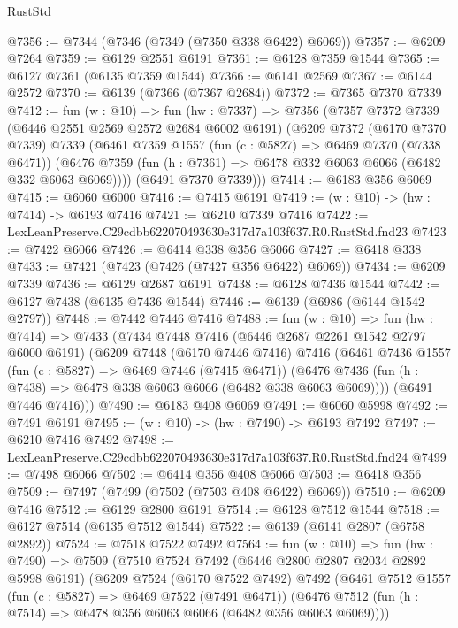 \begin{lexlean}{RustStd}
\begin{coremodule}
@7356 := @7344 (@7346 (@7349 (@7350 @338 @6422) @6069))
@7357 := @6209 @7264
@7359 := @6129 @2551 @6191
@7361 := @6128 @7359 @1544
@7365 := @6127 @7361 (@6135 @7359 @1544)
@7366 := @6141 @2569
@7367 := @6144 @2572
@7370 := @6139 (@7366 (@7367 @2684))
@7372 := @7365 @7370 @7339
@7412 := fun (w : @10) =>
  fun (hw : @7337) =>
  @7356
    (@7357
      @7372
      @7339
      (@6446 @2551 @2569 @2572 @2684 @6002 @6191)
      (@6209
        @7372
        (@6170 @7370 @7339)
        @7339
        (@6461
          @7359
          @1557
          (fun (c : @5827) => @6469 @7370 (@7338 @6471))
          (@6476 @7359 (fun (h : @7361) => @6478 @332 @6063 @6066 (@6482 @332 @6063 @6069))))
        (@6491 @7370 @7339)))
@7414 := @6183 @356 @6069
@7415 := @6060 @6000
@7416 := @7415 @6191
@7419 := (w : @10) -> (hw : @7414) -> @6193 @7416
@7421 := @6210 @7339 @7416
@7422 := LexLeanPreserve.C29cdbb622070493630e317d7a103f637.R0.RustStd.fnd23
@7423 := @7422 @6066
@7426 := @6414 @338 @356 @6066
@7427 := @6418 @338
@7433 := @7421 (@7423 (@7426 (@7427 @356 @6422) @6069))
@7434 := @6209 @7339
@7436 := @6129 @2687 @6191
@7438 := @6128 @7436 @1544
@7442 := @6127 @7438 (@6135 @7436 @1544)
@7446 := @6139 (@6986 (@6144 @1542 @2797))
@7448 := @7442 @7446 @7416
@7488 := fun (w : @10) =>
  fun (hw : @7414) =>
  @7433
    (@7434
      @7448
      @7416
      (@6446 @2687 @2261 @1542 @2797 @6000 @6191)
      (@6209
        @7448
        (@6170 @7446 @7416)
        @7416
        (@6461
          @7436
          @1557
          (fun (c : @5827) => @6469 @7446 (@7415 @6471))
          (@6476 @7436 (fun (h : @7438) => @6478 @338 @6063 @6066 (@6482 @338 @6063 @6069))))
        (@6491 @7446 @7416)))
@7490 := @6183 @408 @6069
@7491 := @6060 @5998
@7492 := @7491 @6191
@7495 := (w : @10) -> (hw : @7490) -> @6193 @7492
@7497 := @6210 @7416 @7492
@7498 := LexLeanPreserve.C29cdbb622070493630e317d7a103f637.R0.RustStd.fnd24
@7499 := @7498 @6066
@7502 := @6414 @356 @408 @6066
@7503 := @6418 @356
@7509 := @7497 (@7499 (@7502 (@7503 @408 @6422) @6069))
@7510 := @6209 @7416
@7512 := @6129 @2800 @6191
@7514 := @6128 @7512 @1544
@7518 := @6127 @7514 (@6135 @7512 @1544)
@7522 := @6139 (@6141 @2807 (@6758 @2892))
@7524 := @7518 @7522 @7492
@7564 := fun (w : @10) =>
  fun (hw : @7490) =>
  @7509
    (@7510
      @7524
      @7492
      (@6446 @2800 @2807 @2034 @2892 @5998 @6191)
      (@6209
        @7524
        (@6170 @7522 @7492)
        @7492
        (@6461
          @7512
          @1557
          (fun (c : @5827) => @6469 @7522 (@7491 @6471))
          (@6476 @7512 (fun (h : @7514) => @6478 @356 @6063 @6066 (@6482 @356 @6063 @6069))))

\end{coremodule}
\end{lexlean}
